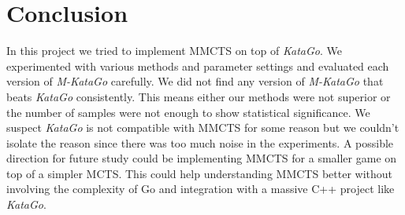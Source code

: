 \documentclass{article}
\newcommand{\katago}{\emph{KataGo}\xspace}
\newcommand{\mkatago}{\emph{M-KataGo}\xspace}
\begin{document}
\section{Conclusion}
In this project we tried to implement MMCTS on top of \katago.
We experimented with various methods and parameter settings and evaluated each version of \mkatago carefully.
We did not find any version of \mkatago that beats \katago consistently.
This means either our methods were not superior or the number of samples were not enough to show statistical significance.
We suspect \katago is not compatible with MMCTS for some reason but we couldn't isolate the reason since there was too much noise in the experiments.
A possible direction for future study could be implementing MMCTS for a smaller game on top of a simpler MCTS.
This could help understanding MMCTS better without involving the complexity of Go and integration with a massive C++ project like \katago.




\end{document}
